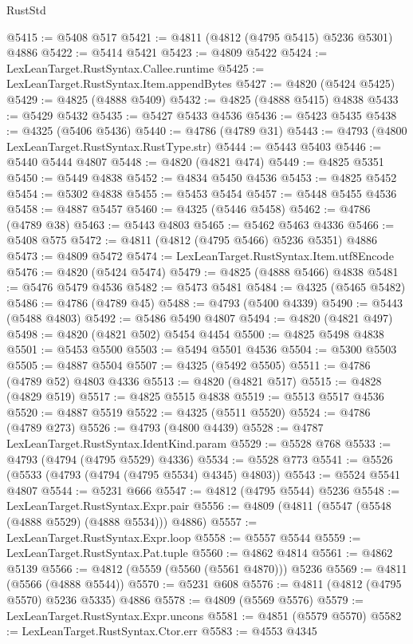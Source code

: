 \begin{lexlean}{RustStd}
\begin{coremodule}
{\begin{coremodule}
{{{{{{{{{{{{{{{{{{{{{{{{{{{{{{{{{{{{{{{{{{{{{{{{{{{{{{{{{{{{{{{{{{{{{{{{{{{{{{{{@5415 := @5408 @517
@5421 := @4811 (@4812 (@4795 @5415) @5236 @5301) @4886
@5422 := @5414 @5421
@5423 := @4809 @5422
@5424 := LexLeanTarget.RustSyntax.Callee.runtime
@5425 := LexLeanTarget.RustSyntax.Item.appendBytes
@5427 := @4820 (@5424 @5425)
@5429 := @4825 (@4888 @5409)
@5432 := @4825 (@4888 @5415) @4838
@5433 := @5429 @5432
@5435 := @5427 @5433 @4536
@5436 := @5423 @5435
@5438 := @4325 (@5406 @5436)
@5440 := @4786 (@4789 @31)
@5443 := @4793 (@4800 LexLeanTarget.RustSyntax.RustType.str)
@5444 := @5443 @5403
@5446 := @5440 @5444 @4807
@5448 := @4820 (@4821 @474)
@5449 := @4825 @5351
@5450 := @5449 @4838
@5452 := @4834 @5450 @4536
@5453 := @4825 @5452
@5454 := @5302 @4838
@5455 := @5453 @5454
@5457 := @5448 @5455 @4536
@5458 := @4887 @5457
@5460 := @4325 (@5446 @5458)
@5462 := @4786 (@4789 @38)
@5463 := @5443 @4803
@5465 := @5462 @5463 @4336
@5466 := @5408 @575
@5472 := @4811 (@4812 (@4795 @5466) @5236 @5351) @4886
@5473 := @4809 @5472
@5474 := LexLeanTarget.RustSyntax.Item.utf8Encode
@5476 := @4820 (@5424 @5474)
@5479 := @4825 (@4888 @5466) @4838
@5481 := @5476 @5479 @4536
@5482 := @5473 @5481
@5484 := @4325 (@5465 @5482)
@5486 := @4786 (@4789 @45)
@5488 := @4793 (@5400 @4339)
@5490 := @5443 (@5488 @4803)
@5492 := @5486 @5490 @4807
@5494 := @4820 (@4821 @497)
@5498 := @4820 (@4821 @502) @5454 @4454
@5500 := @4825 @5498 @4838
@5501 := @5453 @5500
@5503 := @5494 @5501 @4536
@5504 := @5300 @5503
@5505 := @4887 @5504
@5507 := @4325 (@5492 @5505)
@5511 := @4786 (@4789 @52) @4803 @4336
@5513 := @4820 (@4821 @517)
@5515 := @4828 (@4829 @519)
@5517 := @4825 @5515 @4838
@5519 := @5513 @5517 @4536
@5520 := @4887 @5519
@5522 := @4325 (@5511 @5520)
@5524 := @4786 (@4789 @273)
@5526 := @4793 (@4800 @4439)
@5528 := @4787 LexLeanTarget.RustSyntax.IdentKind.param
@5529 := @5528 @768
@5533 := @4793 (@4794 (@4795 @5529) @4336)
@5534 := @5528 @773
@5541 := @5526 (@5533 (@4793 (@4794 (@4795 @5534) @4345) @4803))
@5543 := @5524 @5541 @4807
@5544 := @5231 @666
@5547 := @4812 (@4795 @5544) @5236
@5548 := LexLeanTarget.RustSyntax.Expr.pair
@5556 := @4809 (@4811 (@5547 (@5548 (@4888 @5529) (@4888 @5534))) @4886)
@5557 := LexLeanTarget.RustSyntax.Expr.loop
@5558 := @5557 @5544
@5559 := LexLeanTarget.RustSyntax.Pat.tuple
@5560 := @4862 @4814
@5561 := @4862 @5139
@5566 := @4812 (@5559 (@5560 (@5561 @4870))) @5236
@5569 := @4811 (@5566 (@4888 @5544))
@5570 := @5231 @608
@5576 := @4811 (@4812 (@4795 @5570) @5236 @5335) @4886
@5578 := @4809 (@5569 @5576)
@5579 := LexLeanTarget.RustSyntax.Expr.uncons
@5581 := @4851 (@5579 @5570)
@5582 := LexLeanTarget.RustSyntax.Ctor.err
@5583 := @4553 @4345
}}}}}}}}}}}}}}}}}}}}}}}}}}}}}}}}}}}}}}}}}}}}}}}}}}}}}}}}}}}}}}}}}}}}}}}}}}}}}}}}
\end{coremodule}}
\end{coremodule}
\end{lexlean}
